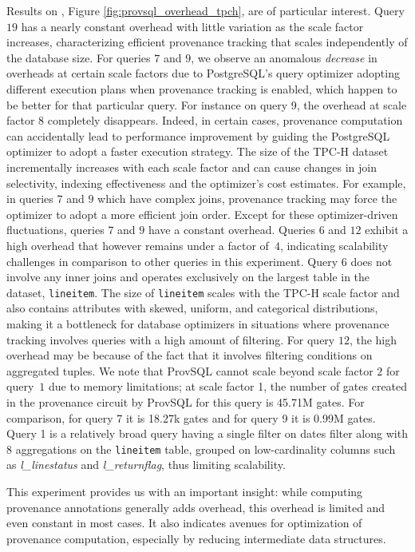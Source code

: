 Results on \qtpc, Figure \ref{fig:provsql_overhead_tpch},
are of particular interest.
Query $19$ has a nearly constant overhead with little variation as the scale factor increases, characterizing efficient provenance tracking that scales independently of the database size.
For queries $7$ and $9$, we observe an anomalous \emph{decrease} in
overheads at certain scale factors due to PostgreSQL's query
optimizer adopting different execution plans when provenance tracking is
enabled, which happen to be better for that particular query. For
instance on query 9, the overhead at scale factor 8 completely
disappears. Indeed, in certain cases, provenance computation can
accidentally lead to performance improvement by guiding the PostgreSQL
optimizer to adopt a faster execution strategy. The size of the TPC-H
dataset incrementally increases with each scale factor and can cause
changes in join selectivity, indexing effectiveness and the optimizer's
cost estimates. For example, in queries $7$ and $9$ which have complex
joins, provenance tracking may force the optimizer to adopt a more
efficient join order. Except for these optimizer-driven fluctuations,
queries $7$ and $9$ have a constant overhead.
Queries $6$ and $12$ exhibit a high overhead that however remains under a
factor of~$4$, indicating scalability challenges in comparison to other
queries in this experiment. Query 6 does not involve any inner joins and
operates exclusively on the largest table in the dataset,
\texttt{lineitem}. The size of \texttt{lineitem} scales with the TPC-H
scale factor and also contains attributes with skewed, uniform, and
categorical distributions, making it a bottleneck for database optimizers
in situations where provenance tracking involves queries with a high
amount of filtering. For query $12$, the high overhead may be because of
the fact that it involves filtering conditions on aggregated tuples.
We note that ProvSQL cannot scale beyond scale factor $2$ for query~$1$ due
to memory limitations; at scale factor 1, the number of gates created in
the provenance circuit by ProvSQL for this query is
45.71M gates. For comparison, for query 7 it is 18.27k gates and
for query 9 it is 0.99M gates. Query 1 is a relatively broad query having a single filter on dates
filter along with $8$ aggregations on the
\texttt{lineitem} table, grouped on low-cardinality
columns such as \emph{l\_linestatus} and \emph{l\_returnflag}, thus limiting
scalability.


This experiment provides us with an important insight: while computing
provenance annotations generally adds overhead, this overhead is limited and even constant in most cases. It also indicates avenues for optimization of provenance computation, especially by reducing intermediate data structures.

